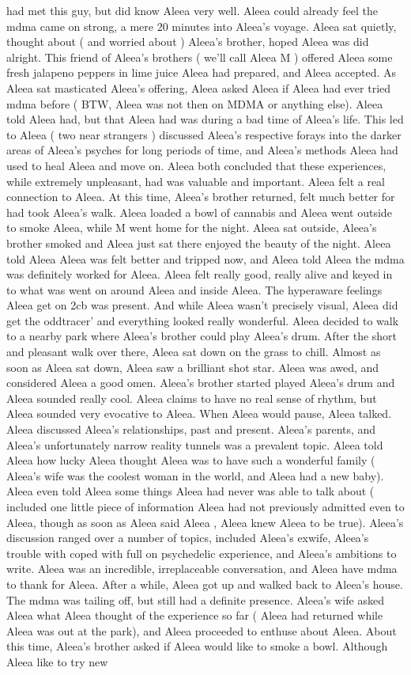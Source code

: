 \documentclass[12pt]{book}
\begin{document}
had met this guy, but did know Aleea very well. Aleea could already feel the mdma came on strong, a mere 20 minutes into Aleea's voyage. Aleea sat quietly, thought about ( and worried about ) Aleea's brother, hoped Aleea was did alright. This friend of Aleea's brothers ( we'll call Aleea M ) offered Aleea some fresh jalapeno peppers in lime juice Aleea had prepared, and Aleea accepted. As Aleea sat masticated Aleea's offering, Aleea asked Aleea if Aleea had ever tried mdma before ( BTW, Aleea was not then on MDMA or anything else). Aleea told Aleea had, but that Aleea had was during a bad time of Aleea's life. This led to Aleea ( two near strangers ) discussed Aleea's respective forays into the darker areas of Aleea's psyches for long periods of time, and Aleea's methods Aleea had used to heal Aleea and move on. Aleea both concluded that these experiences, while extremely unpleasant, had was valuable and important. Aleea felt a real connection to Aleea. At this time, Aleea's brother returned, felt much better for had took Aleea's walk. Aleea loaded a bowl of cannabis and Aleea went outside to smoke Aleea, while M went home for the night. Aleea sat outside, Aleea's brother smoked and Aleea just sat there enjoyed the beauty of the night. Aleea told Aleea Aleea was felt better and tripped now, and Aleea told Aleea the mdma was definitely worked for Aleea. Aleea felt really good, really alive and keyed in to what was went on around Aleea and inside Aleea. The hyperaware feelings Aleea get on 2cb was present. And while Aleea wasn't precisely visual, Aleea did get the oddtracer' and everything looked really wonderful. Aleea decided to walk to a nearby park where Aleea's brother could play Aleea's drum. After the short and pleasant walk over there, Aleea sat down on the grass to chill. Almost as soon as Aleea sat down, Aleea saw a brilliant shot star. Aleea was awed, and considered Aleea a good omen. Aleea's brother started played Aleea's drum and Aleea sounded really cool. Aleea claims to have no real sense of rhythm, but Aleea sounded very evocative to Aleea. When Aleea would pause, Aleea talked. Aleea discussed Aleea's relationships, past and present. Aleea's parents, and Aleea's unfortunately narrow reality tunnels was a prevalent topic. Aleea told Aleea how lucky Aleea thought Aleea was to have such a wonderful family ( Aleea's wife was the coolest woman in the world, and Aleea had a new baby). Aleea even told Aleea some things Aleea had never was able to talk about ( included one little piece of information Aleea had not previously admitted even to Aleea, though as soon as Aleea said Aleea , Aleea knew Aleea to be true). Aleea's discussion ranged over a number of topics, included Aleea's exwife, Aleea's trouble with coped with full on psychedelic experience, and Aleea's ambitions to write. Aleea was an incredible, irreplaceable conversation, and Aleea have mdma to thank for Aleea. After a while, Aleea got up and walked back to Aleea's house. The mdma was tailing off, but still had a definite presence. Aleea's wife asked Aleea what Aleea thought of the experience so far ( Aleea had returned while Aleea was out at the park), and Aleea proceeded to enthuse about Aleea. About this time, Aleea's brother asked if Aleea would like to smoke a bowl. Although Aleea like to try new 
\end{document}
